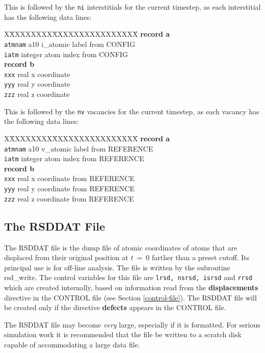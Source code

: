 This is followed by the {\tt ni} interstitials for the current
timestep, as each interstitial has the following data lines:
\begin{tabbing}
X\=XXXXXXXX\=XXXXXXXXXXXXXXXX\=\kill
{\bf record a}  \\
\> {\tt atmnam} \> a10     \> i\_atomic label from CONFIG \\
\> {\tt iatm}   \> integer \> atom index from CONFIG \\
{\bf record b} \\
\> {\tt xxx}    \> real    \> x coordinate \\
\> {\tt yyy}    \> real    \> y coordinate \\
\> {\tt zzz}    \> real    \> z coordinate
\end{tabbing}
This is followed by the {\tt nv} vacancies for the current
timestep, as each vacancy has the following data lines:
\begin{tabbing}
X\=XXXXXXXX\=XXXXXXXXXXXXXXXX\=\kill
{\bf record a}  \\
\> {\tt atmnam} \> a10     \> v\_atomic label from REFERENCE \\
\> {\tt iatm}   \> integer \> atom index from REFERENCE \\
{\bf record b} \\
\> {\tt xxx}    \> real    \> x coordinate from REFERENCE \\
\> {\tt yyy}    \> real    \> y coordinate from REFERENCE \\
\> {\tt zzz}    \> real    \> z coordinate from REFERENCE
\end{tabbing}

\subsection{The RSDDAT File}
\label{rsddat-file}

The RSDDAT file is the dump file of atomic coordinates of atoms
that are displaced from their original position at $t~=~0$ farther
than a preset cutoff.  Its principal use is for off-line analysis.
The file is written by the subroutine {\sc rsd\_write}.  The control
variables for this file are {\tt lrsd, nsrsd, isrsd} and {\tt rrsd}
which are created internally, based on information read from
the {\bf displacements} directive in the CONTROL file (see Section
\ref{control-file}).  The RSDDAT file will be created only if the
directive {\bf defects} appears in the CONTROL file.

The RSDDAT file may become {\em very} large, especially if it is
formatted.  For serious simulation work it is recommended that the
file be written to a scratch disk capable of accommodating a large
data file.


